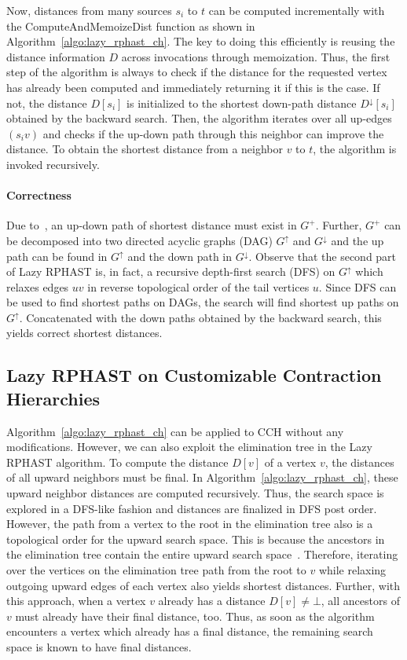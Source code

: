 \documentclass[manuscript,review]{acmart}
\newcommand*{\gchu}{G^{\uparrow}}
\newcommand*{\gchd}{G^{\downarrow}}
\begin{document}
Now, distances from many sources $s_i$ to $t$ can be computed incrementally with the \textsf{ComputeAndMemoizeDist} function as shown in Algorithm~\ref{algo:lazy_rphast_ch}.
The key to doing this efficiently is reusing the distance information $D$ across invocations through memoization.
Thus, the first step of the algorithm is always to check if the distance for the requested vertex has already been computed and immediately returning it if this is the case.
If not, the distance $D[s_i]$ is initialized to the shortest down-path distance $D^{\downarrow}[s_i]$ obtained by the backward search.
Then, the algorithm iterates over all up-edges $(s_i v)$ and checks if the up-down path through this neighbor can improve the distance.
To obtain the shortest distance from a neighbor $v$ to $t$, the algorithm is invoked recursively.

\paragraph{Correctness}
Due to~\cite{gssv-erlrn-12}, an up-down path of shortest distance must exist in $G^+$.
Further, $G^+$ can be decomposed into two directed acyclic graphs (DAG) $\gchu$ and $\gchd$ and the up path can be found in $\gchu$ and the down path in $\gchd$.
Observe that the second part of Lazy RPHAST is, in fact, a recursive depth-first search (DFS) on $\gchu$ which relaxes edges $uv$ in reverse topological order of the tail vertices $u$.
Since DFS can be used to find shortest paths on DAGs, the search will find shortest up paths on $\gchu$.
Concatenated with the down paths obtained by the backward search, this yields correct shortest distances.

\subsection{Lazy RPHAST on Customizable Contraction Hierarchies}

Algorithm~\ref{algo:lazy_rphast_ch} can be applied to CCH without any modifications.
However, we can also exploit the elimination tree in the Lazy RPHAST algorithm.
To compute the distance $D[v]$ of a vertex $v$, the distances of all upward neighbors must be final.
In Algorithm~\ref{algo:lazy_rphast_ch}, these upward neighbor distances are computed recursively.
Thus, the search space is explored in a DFS-like fashion and distances are finalized in DFS post order.
However, the path from a vertex to the root in the elimination tree also is a topological order for the upward search space.
This is because the ancestors in the elimination tree contain the entire upward search space~\cite{bcrw-s-16}.
Therefore, iterating over the vertices on the elimination tree path from the root to $v$ while relaxing outgoing upward edges of each vertex also yields shortest distances.
Further, with this approach, when a vertex $v$ already has a distance $D[v] \neq \bot$, all ancestors of $v$ must already have their final distance, too.
Thus, as soon as the algorithm encounters a vertex which already has a final distance, the remaining search space is known to have final distances.
\end{document}
